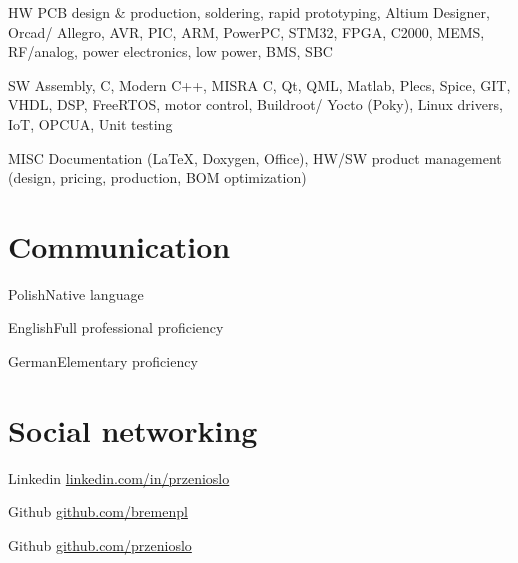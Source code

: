 \documentclass{tccv}
\begin{document}
\begin{factlist}

\item{HW}
     {PCB design \& production, soldering, rapid prototyping, Altium Designer, Orcad/ Allegro, AVR, PIC, ARM, PowerPC, STM32, FPGA, C2000, MEMS, RF/analog, power electronics, low power, BMS, SBC}

\item{SW}
     {Assembly, C, Modern C++, MISRA C, Qt, QML, Matlab, Plecs, Spice, GIT, VHDL, DSP, FreeRTOS, motor control, Buildroot/ Yocto (Poky), Linux drivers, IoT, OPCUA, Unit testing}
     
\item{MISC}
     {Documentation (\LaTeX, Doxygen, Office), HW/SW product management (design, pricing, production, BOM optimization)}

\end{factlist}

\section{Communication}

\begin{factlist}
\item{Polish}{Native language}
\item{English}{Full professional proficiency}
\item{German}{Elementary proficiency}
\end{factlist}

\section{Social networking}

\begin{factlist}

\item{Linkedin}
     {\href{http://pl.linkedin.com/in/przenioslo}{linkedin.com/in/przenioslo}}
     
\item{Github}
     {\href{http://github.com/bremenpl}{github.com/bremenpl}}
     
\item{Github}
     {\href{http://github.com/przenioslo}{github.com/przenioslo}}

\end{factlist} 

\vspace*{\fill} %
\end{document}
